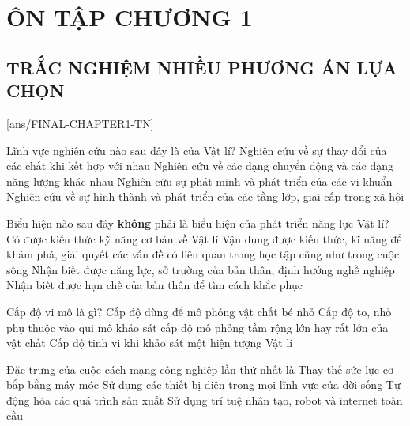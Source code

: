\section{ÔN TẬP CHƯƠNG 1}
\subsection{TRẮC NGHIỆM NHIỀU PHƯƠNG ÁN LỰA CHỌN}
\setcounter{ex}{0}
[ans/FINAL-CHAPTER1-TN]
\begin{ex}
Lĩnh vực nghiên cứu nào sau đây là của Vật lí?	\choice
	{Nghiên cứu về sự thay đổi của các chất khi kết hợp với nhau} 
	{\True Nghiên cứu về các dạng chuyển động và các dạng năng lượng khác nhau}
	{Nghiên cứu sự phát minh và phát triển của các vi khuẩn}
	{Nghiên cứu về sự hình thành và phát triển của các tầng lớp, giai cấp trong xã hội}
\end{ex}

\begin{ex}
Biểu hiện nào sau đây \textbf{không} phải là biểu hiện của phát triển năng lực Vật lí?	\choice
	{Có được kiến thức kỹ năng cơ bản về Vật lí}
	{Vận dụng được kiến thức, kĩ năng để khám phá, giải quyết các vấn đề có liên quan trong học tập cũng như trong cuộc sống}
	{Nhận biết được năng lực, sở trường của bản thân, định hướng nghề nghiệp}
	{\True Nhận biết được hạn chế của bản thân để tìm cách khắc phục}
	
\end{ex}

\begin{ex}
Cấp độ vi mô là gì?	\choice
	{\True Cấp độ dùng để mô phỏng vật chất bé nhỏ}
	{Cấp độ to, nhỏ phụ thuộc vào qui mô khảo sát}
	{cấp độ mô phỏng tầm rộng lớn hay rất lớn của vật chất}
	{Cấp độ tinh vi khi khảo sát một hiện tượng Vật lí}
	
\end{ex}


\begin{ex}
	Đặc trưng của cuộc cách mạng công nghiệp lần thứ nhất là \choice
	{\True Thay thế sức lực cơ bắp bằng máy móc}
	{Sử dụng các thiết bị điện trong mọi lĩnh vực của đời sống}
	{Tự động hóa các quá trình sản xuất}
	{Sử dụng trí tuệ nhân tạo, robot và internet toàn cầu}
\end{ex}



